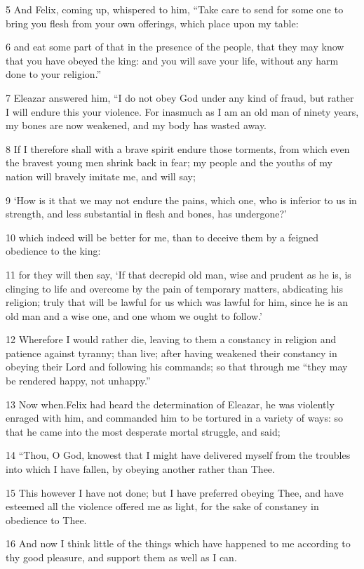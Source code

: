 5 And Felix, coming up, whispered to him, “Take care to send for some one to bring you flesh from your own offerings, which place upon my table: 

6 and eat some part of that in the presence of the people, that they may know that you have obeyed the king: and you will save your life, without any harm done to your religion.” 

7 Eleazar answered him, “I do not obey God under any kind of fraud, but rather I will endure this your violence. For inasmuch as I am an old man of ninety years, my bones are now weakened, and my body has wasted away. 

8 If I therefore shall with a brave spirit endure those torments, from which even the bravest young men shrink back in fear; my people and the youths of my nation will bravely imitate me, and will say; 

9 ‘How is it that we may not endure the pains, which one, who is inferior to us in strength, and less substantial in flesh and bones, has undergone?’ 

10 which indeed will be better for me, than to deceive them by a feigned obedience to the king: 

11 for they will then say, ‘If that decrepid old man, wise and prudent as he is, is clinging to life and overcome by the pain of temporary matters, abdicating his religion; truly that will be lawful for us which was lawful for him, since he is an old man and a wise one, and one whom we ought to follow.’ 

12 Wherefore I would rather die, leaving to them a constancy in religion and patience against tyranny; than live; after having weakened their constancy in obeying their Lord and following his commands; so that through me “they may be rendered happy, not unhappy.” 

13 Now when.Felix had heard the determination of Eleazar, he was violently enraged with him, and commanded him to be tortured in a variety of ways: so that he came into the most desperate mortal struggle, and said; 

14 “Thou, O God, knowest that I might have delivered myself from the troubles into which I have fallen, by obeying another rather than Thee. 

15 This however I have not done; but I have preferred obeying Thee, and have esteemed all the violence offered me as light, for the sake of constaney in obedience to Thee. 

16 And now I think little of the things which have happened to me according to thy good pleasure, and support them as well as I can. 

